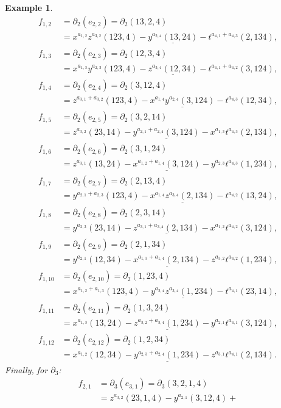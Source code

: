 \documentclass[10pt]{amsart}
\newcommand{\dif}{\mbox{$\partial$}}
\newtheorem{example}[cdrthm]{Example}
\theoremstyle{definition}
\theoremstyle{remark}
\begin{document}
\begin{example}
\begin{align*}
f_{1,2}&=  \dif_2(e_{2,2})=\dif_2(13,2,4)\\ 
&= x^{a_{1,2}}z^{a_{3,2}}(123,4)-\underline{y^{a_{2,4}}(13,24)}-
t^{a_{4,1}+a_{4,3}}(2,134),\\
f_{1,3}&= \dif_2(e_{2,3})=\dif_2(12,3,4)\\
&= x^{a_{1,3}}y^{a_{2,3}}(123,4)-\underline{z^{a_{3,4}}(12,34)}-
t^{a_{4,1}+a_{4,2}}(3,124),\\
f_{1,4}&=\dif_2(e_{2,4})=\dif_2(3,12,4)\\ 
&= z^{a_{3,1}+a_{3,2}}(123,4)-\underline{x^{a_{1,4}}y^{a_{2,4}}(3,124)}-
t^{a_{4,3}}(12,34),\\
f_{1,5}&= \dif_2(e_{2,5})=\dif_2(3,2,14)\\
&= z^{a_{3,2}}(23,14)-\underline{y^{a_{2,1}+a_{2,4}}(3,124)}-
x^{a_{1,3}}t^{a_{4,3}}(2,134),\\
f_{1,6}&= \dif_2(e_{2,6})=\dif_2(3,1,24)\\ 
&= z^{a_{3,1}}(13,24)-\underline{x^{a_{1,2}+a_{1,4}}(3,124)}-
y^{a_{2,3}}t^{a_{4,3}}(1,234),\\
f_{1,7}&= \dif_2(e_{2,7})=\dif_2(2,13,4)\\
&= y^{a_{2,1}+a_{2,3}}(123,4)-\underline{x^{a_{1,4}}z^{a_{3,4}}(2,134)}-
t^{a_{4,2}}(13,24),\\
f_{1,8}&= \dif_2(e_{2,8})=\dif_2(2,3,14)\\ 
&= y^{a_{2,3}}(23,14)-\underline{z^{a_{3,1}+a_{3,4}}(2,134)}-
x^{a_{1,2}}t^{a_{4,2}}(3,124),\\
f_{1,9}&= \dif_2(e_{2,9})=\dif_2(2,1,34)\\
&= y^{a_{2,1}}(12,34)-\underline{x^{a_{1,3}+a_{1,4}}(2,134)}-
z^{a_{3,2}}t^{a_{4,2}}(1,234),\\
f_{1,10}&= \dif_2(e_{2,10})=\dif_2(1,23,4)\\ 
&= x^{a_{1,2}+a_{1,3}}(123,4)-\underline{y^{a_{2,4}}z^{a_{3,4}}(1,234)}-
t^{a_{4,1}}(23,14),\\
f_{1,11}&=\dif_2(e_{2,11})=\dif_2(1,3,24)\\
&= x^{a_{1,3}}(13,24)-\underline{z^{a_{3,2}+a_{3,4}}(1,234)}-
y^{a_{2,1}}t^{a_{4,1}}(3,124),\\
f_{1,12}&= \dif_2(e_{2,12})=\dif_2(1,2,34)\\ 
&= x^{a_{1,2}}(12,34)-\underline{y^{a_{2,3}+a_{2,4}}(1,234)}-
z^{a_{3,1}}t^{a_{4,1}}(2,134).
\end{align*}
Finally, for $\dif_3$:
\begin{align*}
f_{2,1}&= \dif_3(e_{3,1})=
\dif_3(3,2,1,4)\\ &= z^{a_{3,2}}(23,1,4)-y^{a_{2,1}}(3,12,4)+

\end{align*}
\end{example}
\end{document}
